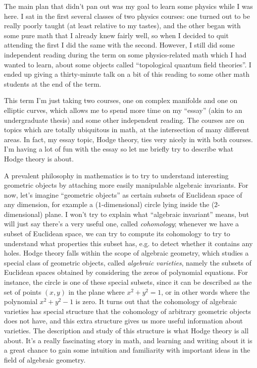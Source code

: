 The main plan that didn't pan out was my goal to learn some physics while I was here. I sat in the first several classes of two physics courses: one turned out to be really poorly taught (at least relative to my tastes), and the other began with some pure math that I already knew fairly well, so when I decided to quit attending the first I did the same with the second. However, I still did some independent reading during the term on some physics-related math which I had wanted to learn, about some objects called ``topological quantum field theories''. I ended up giving a thirty-minute talk on a bit of this reading to some other math students at the end of the term.

This term I'm just taking two courses, one on complex manifolds and one on elliptic curves, which allows me to spend more time on my ``essay'' (akin to an undergraduate thesis) and some other independent reading. The courses are on topics which are totally ubiquitous in math, at the intersection of many different areas. In fact, my essay topic, Hodge theory, ties very nicely in with both courses. I'm having a lot of fun with the essay so let me briefly try to describe what Hodge theory is about.

A prevalent philosophy in mathematics is to try to understand interesting geometric objects by attaching more easily manipulable algebraic invariants. For now, let's imagine ``geometric objects'' as certain subsets of Euclidean space of any dimension, for example a ($1$-dimensional) circle lying inside the ($2$-dimensional) plane. I won't try to explain what ``algebraic invariant'' means, but will just say there's a very useful one, called \emph{cohomology}; whenever we have a subset of Euclidean space, we can try to compute its cohomology to try to understand what properties this subset has, e.g. to detect whether it contains any holes. Hodge theory falls within the scope of algebraic geometry, which studies a special class of geometric objects, called \emph{algebraic varieties}, namely the subsets of Euclidean spaces obtained by considering the zeros of polynomial equations. For instance, the circle is one of these special subsets, since it can be described as the set of points $(x,y)$ in the plane where $x^2 + y^2 = 1$, or in other words where the polynomial $x^2 + y^2 - 1$ is zero. It turns out that the cohomology of algebraic varieties has special structure that the cohomology of arbitrary geometric objects does not have, and this extra structure gives us more useful information about varieties. The description and study of this structure is what Hodge theory is all about. It's a really fascinating story in math, and learning and writing about it is a great chance to gain some intuition and familiarity with important ideas in the field of algebraic geometry.


% 
% 


